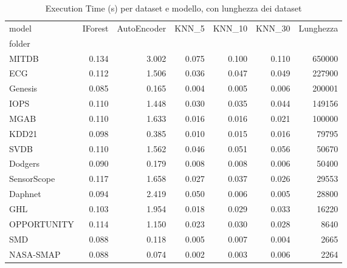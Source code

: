 \begin{table}
\caption{Execution Time (s) per dataset e modello, con lunghezza dei dataset}
\label{tab:execution_time}
\begin{tabular}{lrrrrrr}
\toprule
model & IForest & AutoEncoder & KNN_5 & KNN_10 & KNN_30 & Lunghezza \\
folder &  &  &  &  &  &  \\
\midrule
MITDB & 0.134 & 3.002 & 0.075 & 0.100 & 0.110 & 650000 \\
ECG & 0.112 & 1.506 & 0.036 & 0.047 & 0.049 & 227900 \\
Genesis & 0.085 & 0.165 & 0.004 & 0.005 & 0.006 & 200001 \\
IOPS & 0.110 & 1.448 & 0.030 & 0.035 & 0.044 & 149156 \\
MGAB & 0.110 & 1.633 & 0.016 & 0.016 & 0.021 & 100000 \\
KDD21 & 0.098 & 0.385 & 0.010 & 0.015 & 0.016 & 79795 \\
SVDB & 0.110 & 1.562 & 0.046 & 0.051 & 0.056 & 50670 \\
Dodgers & 0.090 & 0.179 & 0.008 & 0.008 & 0.006 & 50400 \\
SensorScope & 0.117 & 1.658 & 0.027 & 0.037 & 0.026 & 29553 \\
Daphnet & 0.094 & 2.419 & 0.050 & 0.006 & 0.005 & 28800 \\
GHL & 0.103 & 1.954 & 0.018 & 0.029 & 0.033 & 16220 \\
OPPORTUNITY & 0.114 & 1.150 & 0.023 & 0.030 & 0.028 & 8640 \\
SMD & 0.088 & 0.118 & 0.005 & 0.007 & 0.004 & 2665 \\
NASA-SMAP & 0.088 & 0.074 & 0.002 & 0.003 & 0.006 & 2264 \\
\bottomrule
\end{tabular}
\end{table}
